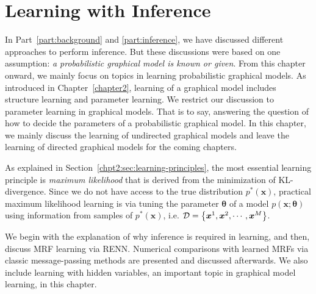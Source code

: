 \chapter{Learning with Inference}
\label{chpt5:undirecteLearning}
In Part~\ref{part:background} and \ref{part:inference}, we have discussed different approaches to perform inference. But these discussions were based on one assumption: \textit{a probabilistic graphical model is known or given}. From this chapter onward, we mainly focus on topics in learning probabilistic graphical models.
As introduced in Chapter~\ref{chapter2}, learning of a graphical model includes structure learning and parameter learning. We restrict our discussion to parameter learning in graphical models. That is to say, answering the question of how to decide the parameters of a probabilistic graphical model.
In this chapter, we mainly discuss the learning of undirected graphical models and leave the learning of directed graphical models for the coming chapters.

As explained in Section~\ref{chpt2:sec:learning-principles}, the most essential learning principle is \textit{maximum likelihood} that is derived from the minimization of KL-divergence. Since we do not have access to the true distribution $p^{\ast}(\bm{x})$, practical maximum likelihood learning is via tuning the parameter $\bm{\theta}$ of a model $p(\bm{x};\bm{\theta})$ using information from samples of $p^{\ast}(\bm{x})$, i.e. $\mathcal{D} = \left\{ \bm{x}^1, \bm{x}^2, \cdots, \bm{x}^{M}\right\}$.

We begin with the explanation of why inference is required in learning, and then, discuss MRF learning via RENN. Numerical comparisons with learned MRFs via classic message-passing methods are presented and discussed afterwards. We also include learning with hidden variables, an important topic in graphical model learning, in this chapter.



